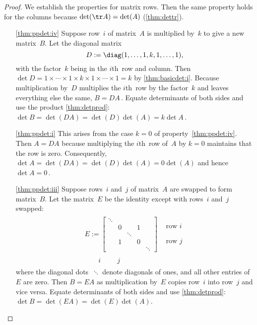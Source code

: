 \begin{proof} 
We establish the  properties for matrix rows.  
Then the same property holds for the columns because \(\det(\tr A)=\det(A)\) (\autoref{thm:dettr}).
\begin{itemize}
\item[\ref{thm:ppdet:iv}]
Suppose row~\(i\) of matrix~\(A\) is multiplied by~\(k\) to give a new matrix~\(B\).
Let the diagonal matrix
\begin{equation*}
D:=\diag(1,\ldots,1,k,1,\ldots,1),
\end{equation*}
with the factor~\(k\) being in the \(i\)th~row and column.
Then \(\det D=1\times\cdots\times1\times k\times1\times\cdots\times1=k\)  by \autoref{thm:basicdet:i}.
Because multiplication by~\(D\) multiplies the \(i\)th~row by the factor~\(k\) and leaves everything else the same,  \(B=DA\)\,.
Equate determinants of both sides and use the product \autoref{thm:detprod}: \(\det B=\det(DA)=\det(D)\det(A)=k\det A\)\,.


\item[\ref{thm:ppdet:i}]
This arises from the case \(k=0\) of property~\ref{thm:ppdet:iv}.
Then \(A=DA\) because multiplying the \(i\)th~row of~\(A\) by \(k=0\) maintains that the row is zero.
Consequently, \(\det A=\det(DA)=\det(D)\det(A)=0\det(A)\) and hence \(\det A=0\)\,.

\item[\ref{thm:ppdet:iii}]
Suppose rows~\(i\) and~\(j\) of matrix~\(A\) are swapped to form matrix~\(B\).
Let the matrix~\(E\) be the identity except with rows~\(i\) and~\(j\) swapped:
\begin{equation*}
\begin{array}{rl}
E:=\begin{bmatrix} 
\ddots
\\&0&&1
\\&&\ddots
\\&1&&0
\\&&&&\ddots \end{bmatrix}&
\begin{matrix} \phantom{\vdots}
\\\text{row }i \\\phantom{\vdots}
\\\text{row }j \\\phantom{\vdots} \end{matrix}
\\
\begin{matrix}\phantom{\cdots}&i&\phantom{\cdots}&j&\phantom{\cdots}  \end{matrix}\quad&
\end{array}
\end{equation*}
where the diagonal dots~\(\ddots\) denote diagonals of ones, and all other entries of~\(E\) are zero.
Then \(B=EA\) as multiplication by~\(E\) copies row~\(i\) into row~\(j\) and vice versa.
Equate determinants of both sides and use \autoref{thm:detprod}: \(\det B=\det(EA)=\det(E)\det(A)\).


\end{itemize}
\end{proof}
